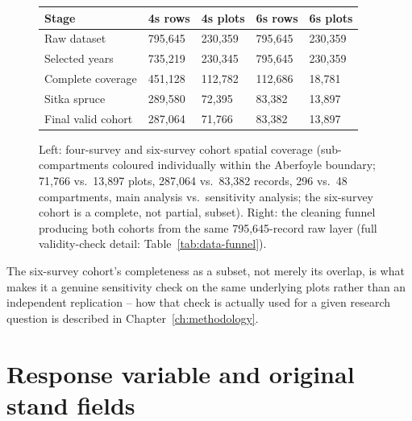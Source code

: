 \begin{figure}[!htbp]
\centering
\begin{minipage}{0.56\textwidth}
\centering
{}
\end{minipage}%
\hfill
\begin{minipage}{0.40\textwidth}
\centering
\scriptsize
\setlength{\tabcolsep}{2pt}
\renewcommand{\arraystretch}{0.9}
\begin{tabular}{p{2.1cm}p{0.85cm}p{0.85cm}p{0.85cm}p{0.85cm}}
\hline
Stage & 4s rows & 4s plots & 6s rows & 6s plots \\
\hline
Raw dataset & 795,645 & 230,359 & 795,645 & 230,359 \\
Selected years & 735,219 & 230,345 & 795,645 & 230,359 \\
Complete coverage & 451,128 & 112,782 & 112,686 & 18,781 \\
Sitka spruce & 289,580 & 72,395 & 83,382 & 13,897 \\
Final valid cohort & 287,064 & 71,766 & 83,382 & 13,897 \\
\hline
\end{tabular}
\end{minipage}
\caption{Left: four-survey and six-survey cohort spatial coverage (sub-compartments coloured
individually within the Aberfoyle boundary; 71,766 vs.\ 13,897 plots, 287,064 vs.\ 83,382 records,
296 vs.\ 48 compartments, main analysis vs.\ sensitivity analysis; the six-survey cohort is a
complete, not partial, subset). Right: the cleaning funnel producing both cohorts from the same
795,645-record raw layer (full validity-check detail: Table~\ref{tab:data-funnel}).}
\label{fig:data-cohort-coverage}
\end{figure}

The six-survey cohort's completeness as a subset, not merely its overlap, is what makes it a
genuine sensitivity check on the same underlying plots rather than an independent replication --
how that check is actually used for a given research question is described in
Chapter~\ref{ch:methodology}.

\section{Response variable and original stand fields}
\label{sec:data-response}

